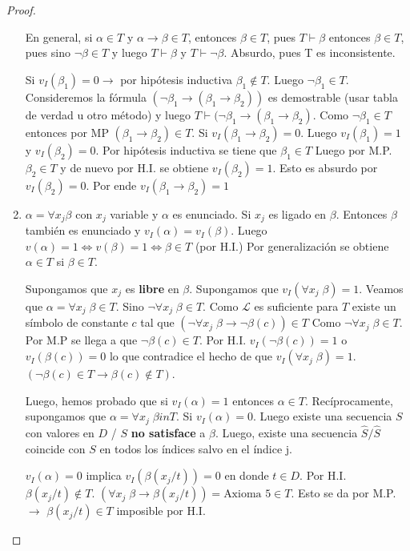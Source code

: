 \begin{proof}
\begin{enumerate}
    \begin{observation}
    En general, si $\alpha \in T$ y $\alpha \rightarrow \beta \in T$, entonces $\beta \in T$, pues $T \vdash \beta$ entonces $\beta \in T$, pues sino $\neg \beta \in T$ y luego $T \vdash \beta$ y $T \vdash \neg \beta$. Absurdo, pues T es inconsistente.
    \end{observation}
    
    Si $v_{I}(\beta_1) = 0 \rightarrow $ por hip\'otesis inductiva $\beta_1 \notin T$. Luego $\neg \beta_1 \in T$. Consideremos la f\'ormula $(\neg \beta_1 \rightarrow (\beta_1 \rightarrow \beta_2))$ es demostrable (usar tabla de verdad u otro m\'etodo) y luego $T \vdash (\neg \beta_1 \rightarrow (\beta_1 \rightarrow \beta_2)$. Como $\neg \beta_1 \in T$ entonces por MP $(\beta_1 \rightarrow \beta_2) \in T$. Si $v_{I}(\beta_1 \rightarrow \beta_2) = 0$. Luego $v_{I}(\beta_1) = 1$ y $v_{I}(\beta_2) = 0$. Por hip\'otesis inductiva se tiene que $\beta_1 \in T$ Luego por M.P.  $\beta_2 \in T$ y de nuevo por H.I. se obtiene $v_{I}(\beta_2) = 1$. Esto es absurdo por $v_{I}(\beta_2) = 0$. Por ende $v_{I}(\beta_1 \rightarrow \beta_2) = 1$
    
    \item $\alpha = \forall x_j \beta$ con $x_j$ variable y $\alpha$ es enunciado. Si $x_j$ es ligado en $\beta$. Entonces $\beta$ tambi\'en es enunciado y $v_{I}(\alpha) = v_{I}(\beta)$. Luego $v(\alpha) = 1 \iff    v(\beta) = 1 \iff \beta \in T$ (por H.I.) Por generalizaci\'on se obtiene $\alpha \in T$ si $\beta \in T$.
    
Supongamos que $x_j$ es \textbf{libre} en $\beta$. Supongamos que $v_{I} (\forall x_j \; \beta) = 1$. Veamos que $\alpha = \forall x_j \; \beta \in T$. Sino $\neg \forall x_j \; \beta \in T$. Como $\mathcal{L}$ es suficiente para $T$ existe un s\'imbolo de constante $c$ tal que $(\neg \forall x_j \; \beta \rightarrow \neg \beta(c)) \in T$ Como $\neg \forall x_j \; \beta \in T$. Por M.P se llega a que $\neg \beta(c) \in T$. Por H.I. $v_{I}(\neg \beta(c)) = 1$ o $v_{I}(\beta(c)) = 0$ lo que contradice el hecho de que $v_{I}(\forall x_j \; \beta) = 1$. $(\neg \beta(c) \in T \rightarrow \beta(c) \notin T)$.

Luego, hemos probado que si $v_{I}(\alpha) = 1$ entonces $\alpha \in T$. Rec\'iprocamente, supongamos que $\alpha = \forall x_j \; \beta in T$. Si $v_{I}(\alpha) = 0$. Luego existe una secuencia $S$ con valores en $D$ / $S$ \textbf{no satisface} a $\beta$. Luego, existe una secuencia $\hat{S} / \hat{S}$ coincide con $S$ en todos los \'indices salvo en el \'indice j.

$v_{I}(\alpha) = 0$ implica $v_{I}(\beta(x_j / t)) = 0$ en donde $t \in D$. Por H.I. $\beta(x_j / t) \notin T$. $(\forall x_j \; \beta \rightarrow \beta(x_j / t)) = \text{Axioma 5} \in T$. Esto se da por M.P. $\rightarrow$ $\beta(x_j / t) \in T$ imposible por H.I.

\end{enumerate}  

\end{proof}

